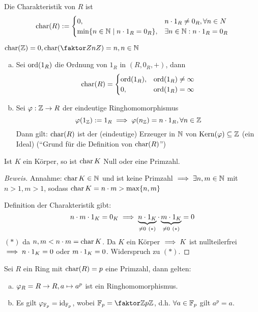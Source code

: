 \documentclass[a4paper]{report}
\begin{document}
\begin{defi}[Charakteristik]
  Die Charakteristik von $R$ ist
  \[\operatorname{char}(R) :=
  \begin{cases}
    0, & n \cdot 1_{R} \ne 0_{R}, \forall n \in N \\
    \min\{n \in \mathbb{N} \mid n \cdot 1_{R} = 0_{R}\}, & \exists n \in \mathbb{N} : n\cdot 1_{R} = 0_{R}
  \end{cases}\]
\end{defi}

\begin{bsp*}
\item $\chr(\Z) = 0, \chr(\fak Z{nZ}) = n, n \in \N$
\end{bsp*}

\begin{bem*}[Übung]
\begin{enumerate}[(a)]
  \item Sei $\operatorname{ord}(1_{R})$ die Ordnung von $1_{R}$ in $(R, 0_{R}, +)$, dann
        \[\operatorname{char}(R) =
        \begin{cases}
          \operatorname{ord}(1_{R}), & \operatorname{ord}(1_{R}) \ne \infty \\
          0, & \operatorname{ord}(1_{R}) = \infty \\
        \end{cases}\]
  \item Sei $\varphi: \mathbb{Z} \to R$ der eindeutige Ringhomomorphismus
        \[\varphi(1_{\mathbb{Z}}) := 1_{R} \implies \varphi (n_{\mathbb{Z}}) = n \cdot 1_{R}, \forall n \in \mathbb{Z}\]
        Dann gilt: $\operatorname{char} (R)$ ist der (eindeutige) Erzeuger in $\mathbb{N}$ von $\operatorname{Kern} (\varphi) \subseteq \mathbb{Z}$ (ein Ideal) (``Grund für die Definition von $\operatorname{char} (R)$'')
\end{enumerate}
\end{bem*}

\begin{prop}
  Ist $K$ ein Körper, so ist $\operatorname{char} K$ Null oder eine Primzahl.
  \begin{proof}[Beweis]Annahme: $\operatorname{char} K \in \mathbb{N}$ und ist keine Primzahl $\implies \exists n, m \in \mathbb{N}$ mit $n > 1, m > 1$, sodass $\operatorname{char} K = n \cdot m > \max\{n,m\}$

    Definition der Charakteristik gibt:
    \[n \cdot m \cdot 1_{K} = 0_{K} \implies \underbrace{n\cdot 1_{K}}_{\ne 0\ (*)} \cdot \underbrace{m \cdot 1_{K}}_{\ne 0\ (*)} = 0\]
    $(*)$ da $n, m < n \cdot m = \operatorname{char} K$. Da $K$ ein Körper $\implies K$ ist nullteilerfrei $\implies n \cdot 1_{K} = 0$ oder $m \cdot 1_{K} = 0$. Widerspruch zu $(*)$. \qedhere
  \end{proof}
\end{prop}

\begin{bsp*}[Übung]
  Sei $R$ ein Ring mit $\operatorname{char} (R) = p$ eine Primzahl, dann gelten:
  \begin{enumerate}[(a)]
    \item $\varphi_{R} = R \to R, a \mapsto a^{p}$ ist ein Ringhomomorphismus.
    \item Es gilt $\varphi_{\mathbb{F}_p} = \operatorname{id}_{\mathbb{F}_p}$, wobei $\Fp = \fak \Z {p\Z}$, d.h. $\forall a \in \mathbb{F}_p$ gilt $a^{p} = a$.
  \end{enumerate}
\end{bsp*}
\end{document}
